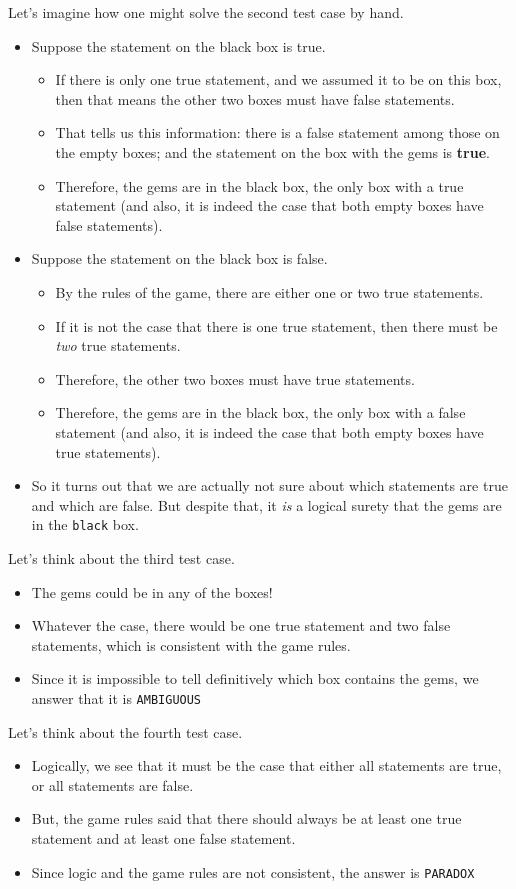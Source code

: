 Let's imagine how one might solve the second test case by hand.
\begin{itemize}
    \item Suppose the statement on the black box is true.
    \begin{itemize}[label=$\circ$]
        \item If there is only one true statement, and we assumed it to be on this box, then that means the other two boxes must have false statements.
        \item That tells us this information:  there is a false statement among those on the empty boxes; and the statement on the box with the gems is \textbf{true}.
        \item Therefore, the gems are in the black box, the only box with a true statement (and also, it is indeed the case that both empty boxes have false statements). 
    \end{itemize}
    \item Suppose the statement on the black box is false.
    \begin{itemize}[label=$\circ$]
        \item By the rules of the game, there are either one or two true statements.
        \item If it is not the case that there is one true statement, then there must be \textit{two} true statements.
        \item Therefore, the other two boxes must have true statements.
        \item Therefore, the gems are in the black box, the only box with a false statement (and also, it is indeed the case that both empty boxes have true statements). 
    \end{itemize}
    \item So it turns out that we are actually not sure about which statements are true and which are false.  But despite that, it \textit{is} a logical surety that the gems are in the \texttt{black} box. 
\end{itemize}
Let's think about the third test case.
\begin{itemize}
    \item The gems could be in any of the boxes!
    \item Whatever the case, there would be one true statement and two false statements, which is consistent with the game rules.
    \item Since it is impossible to tell definitively which box contains the gems, we answer that it is \texttt{AMBIGUOUS}
\end{itemize}
Let's think about the fourth test case.
\begin{itemize}
    \item Logically, we see that it must be the case that either all statements are true, or all statements are false.
    \item But, the game rules said that there should always be at least one true statement and at least one false statement.
    \item Since logic and the game rules are not consistent, the answer is \texttt{PARADOX}
\end{itemize}